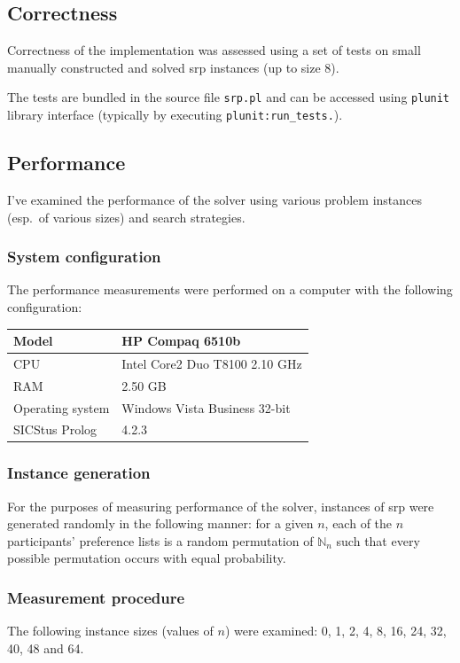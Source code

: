 \documentclass{article}
\newcommand{\nn}{\mathbb{N}_n}
\newcommand{\file}[1]{\texttt{#1}}
\newcommand{\code}[1]{\texttt{#1}}
\newcommand{\prolog}{Prolog}
\newcommand{\sicstusprolog}{SICStus \prolog{}}
\newcommand{\srp}{\acrshort{srp}}
\begin{document}
\subsection{Correctness}
Correctness of the implementation was assessed using a set of tests on small
manually constructed and solved \srp{} instances (up to size 8).

The tests are bundled in the source file \file{srp.pl}
and can be accessed using \code{plunit} library interface
(typically by executing \code{plunit:run\_tests.}).

\subsection{Performance}
I've examined the performance of the solver using various problem instances
(esp.~of various sizes) and search strategies.

\subsubsection{System configuration}
The performance measurements were performed on a computer
with the following configuration:

\begin{tabular}{| l | l |}
\hline
Model & HP Compaq 6510b \\
\hline
CPU & Intel Core2 Duo T8100 2.10 GHz \\
\hline
RAM & 2.50 GB \\
\hline
Operating system & Windows Vista Business 32-bit \\
\hline
\sicstusprolog{} & 4.2.3 \\
\hline
\end{tabular}

\subsubsection{Instance generation}
For the purposes of measuring performance of the solver,
instances of \acrshort{srp} were generated randomly in the following manner:
for a given $n$, each of the $n$ participants' preference lists
is a random permutation of $\nn$
such that every possible permutation occurs with equal probability.

\subsubsection{Measurement procedure}
The following instance sizes (values of $n$) were examined:
0, 1, 2, 4, 8, 16, 24, 32, 40, 48 and 64.
\end{document}
